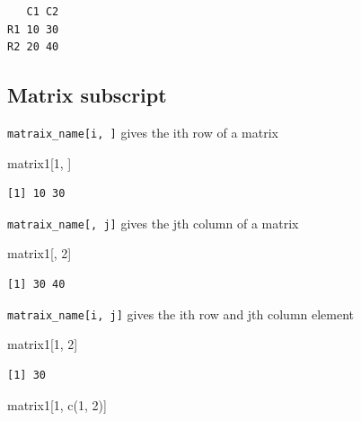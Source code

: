 \documentclass[
  letterpaper,
  DIV=11,
  numbers=noendperiod]{scrreprt}
\newenvironment{Shaded}{\begin{snugshade}}{\end{snugshade}}
\newcommand{\DecValTok}[1]{\textcolor[rgb]{0.68,0.00,0.00}{#1}}
\newcommand{\FunctionTok}[1]{\textcolor[rgb]{0.28,0.35,0.67}{#1}}
\newcommand{\NormalTok}[1]{\textcolor[rgb]{0.00,0.23,0.31}{#1}}
\begin{document}
\begin{verbatim}
   C1 C2
R1 10 30
R2 20 40
\end{verbatim}

\subsection{Matrix subscript}\label{matrix-subscript}

\texttt{matraix\_name{[}i,\ {]}} gives the ith row of a matrix

\begin{Shaded}
\begin{Highlighting}[]
\NormalTok{matrix1[}\DecValTok{1}\NormalTok{, ]}
\end{Highlighting}
\end{Shaded}

\begin{verbatim}
[1] 10 30
\end{verbatim}

\texttt{matraix\_name{[},\ j{]}} gives the jth column of a matrix

\begin{Shaded}
\begin{Highlighting}[]
\NormalTok{matrix1[, }\DecValTok{2}\NormalTok{]}
\end{Highlighting}
\end{Shaded}

\begin{verbatim}
[1] 30 40
\end{verbatim}

\texttt{matraix\_name{[}i,\ j{]}} gives the ith row and jth column
element

\begin{Shaded}
\begin{Highlighting}[]
\NormalTok{matrix1[}\DecValTok{1}\NormalTok{, }\DecValTok{2}\NormalTok{]}
\end{Highlighting}
\end{Shaded}

\begin{verbatim}
[1] 30
\end{verbatim}

\begin{Shaded}
\begin{Highlighting}[]
\NormalTok{matrix1[}\DecValTok{1}\NormalTok{, }\FunctionTok{c}\NormalTok{(}\DecValTok{1}\NormalTok{, }\DecValTok{2}\NormalTok{)] }
\end{Highlighting}
\end{Shaded}
\end{document}
